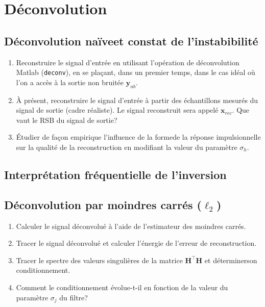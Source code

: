 \section{Déconvolution}

\subsection{Déconvolution \guillemotleft naïve\guillemotright et constat de l'instabibilité}
\begin{enumerate}
	\item Reconstruire le signal d'entrée en utilisant l'opération de déconvolution Matlab (\texttt{deconv}), en se plaçant, dans un premier temps, dans le cas idéal où l'on a accès à la sortie non bruitée $\bm{y}_{nb}$.
	\item À présent, reconstruire le signal d'entrée à partir des échantillons mesurés du signal de sortie  (cadre réaliste). Le signal reconstruit sera appelé $\bm{x}_{rec}$. Que vaut le RSB du signal de sortie?
	\item Étudier de façon empirique l'influence de la \guillemotleft forme\guillemotright de la réponse impulsionnelle sur la qualité de la reconstruction en modifiant la valeur du paramètre $\sigma_h$.
\end{enumerate}

\subsection{Interprétation fréquentielle de l'inversion}

\subsection{Déconvolution par moindres carrés ($\ell_2$)}
\begin{enumerate}
	\item Calculer le signal déconvolué à l'aide de l'estimateur des moindres carrés.
	\item Tracer le signal déconvolué et calculer l'énergie de l'erreur de reconstruction.
	\item Tracer le spectre des valeurs singulières de la matrice $\bm{H}^\top \bm{H}$ et déterminerson conditionnement.
	\item Comment le conditionnement évolue-t-il en fonction de la valeur du paramètre $\sigma_j$ du filtre?
\end{enumerate}

